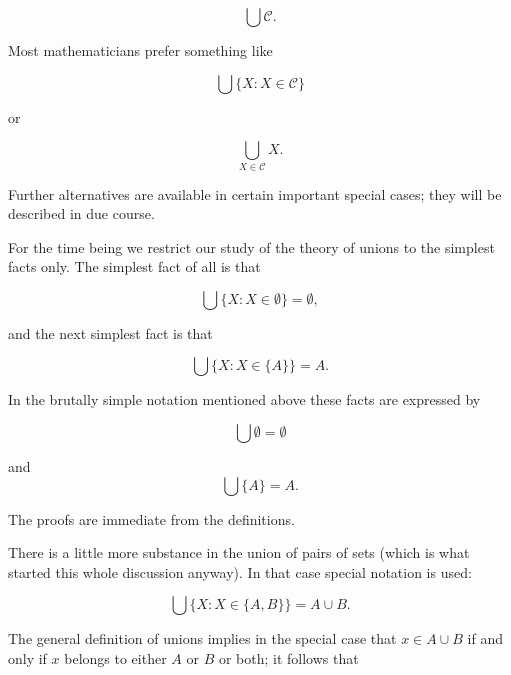 \begin{equation*}
\bigcup \mathcal{C}.
\end{equation*}

Most mathematicians prefer something like 

\begin{equation*}
\bigcup \{ X: X \in \mathcal{C} \}
\end{equation*}

or

\begin{equation*}
\bigcup_{X \in \mathcal{C}} X.
\end{equation*}

Further alternatives are available in certain important special cases; they will be described in due course.

For the time being we restrict our study of the theory of unions to the simplest facts only. The simplest fact of all is that

\begin{equation*}
\bigcup \{ X: X \in \emptyset \} = \emptyset ,
\end{equation*}

and the next simplest fact is that 

\begin{equation*}
\bigcup \{ X: X \in \{ A \} \} = A.
\end{equation*}

In the brutally simple notation mentioned above these facts are expressed by

\begin{equation*}
\bigcup \emptyset = \emptyset
\end{equation*}

and
\begin{equation*}
\bigcup \{ A \} = A.
\end{equation*}

The proofs are immediate from the definitions.

There is a little more substance in the union of pairs of sets (which is what started this whole discussion anyway). In that case special notation is used: 

\begin{equation*}
\bigcup \{ X: X \in \{A, B \} \} = A \cup B.
\end{equation*}

The general definition of unions implies in the special case that $x \in A \cup B$ if and only if $x$ belongs to either $A$ or $B$ or both; it follows that 

